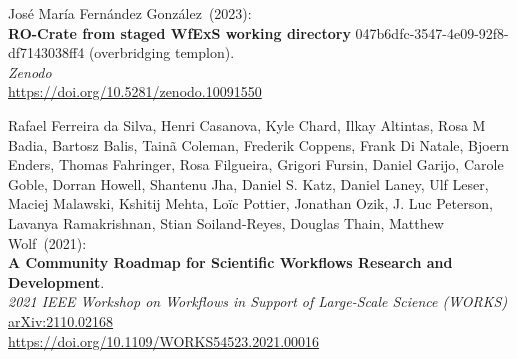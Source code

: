 \begin{thebibliography}{9}
José María Fernández González~(2023): \\
\textbf{RO-Crate from staged WfExS working directory} 047b6dfc-3547-4e09-92f8-df7143038ff4 (overbridging templon).\\
\emph{Zenodo} \\
\url{https://doi.org/10.5281/zenodo.10091550}

Rafael Ferreira da Silva, Henri Casanova, Kyle Chard, Ilkay Altintas, Rosa M Badia, Bartosz Balis, Tainã Coleman, Frederik Coppens, Frank Di Natale, Bjoern Enders, Thomas Fahringer, Rosa Filgueira, Grigori Fursin, Daniel Garijo, Carole Goble, Dorran Howell, Shantenu Jha, Daniel S. Katz, Daniel Laney, Ulf Leser, Maciej Malawski, Kshitij Mehta, Loïc Pottier, Jonathan Ozik, J. Luc Peterson, Lavanya Ramakrishnan, Stian Soiland-Reyes, Douglas Thain, Matthew Wolf~(2021): \\
\textbf{A Community Roadmap for Scientific Workflows Research and Development}.\\
\emph{2021 IEEE Workshop on Workflows in Support of Large-Scale Science (WORKS)}\\
\href{https://doi.org/10.48550/arXiv.2110.02168}{arXiv:2110.02168}\\
\url{https://doi.org/10.1109/WORKS54523.2021.00016}


\end{thebibliography}
